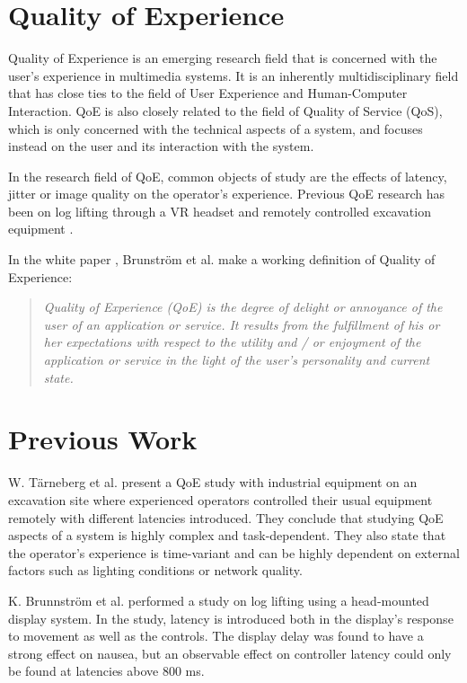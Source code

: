\documentclass[nofilelist]{cslthse-msc}
\begin{document}
\section{Quality of Experience}
Quality of Experience is an emerging research field that is concerned with the user's experience in multimedia systems. It is an inherently multidisciplinary field that has close ties to the field of User Experience and Human-Computer Interaction. QoE is also closely related to the field of Quality of Service (QoS), which is only concerned with the technical aspects of a system, and focuses instead on the user and its interaction with the system.

In the research field of QoE, common objects of study are the effects of latency, jitter or image quality on the operator's experience. Previous QoE research has been on log lifting through a VR headset \cite{industry4.0} and remotely controlled excavation equipment \cite{latency-impact}.

In the white paper \cite{qoe-definition}, Brunström et al. make a working definition of Quality of Experience: 

\begin{quote}
   \textit{Quality of Experience (QoE) is the degree of delight or annoyance of the user of an application or service. It results from the fulfillment of his or her expectations with respect to the utility and / or enjoyment of the application or service in the light of the user’s personality and current state.} 
\end{quote}

\section{Previous Work}

W. Tärneberg et al. \cite{industry4.0} present a QoE study with industrial equipment on an excavation site where experienced operators controlled their usual equipment remotely with different latencies introduced. They conclude that studying QoE aspects of a system is highly complex and task-dependent. They also state that the operator's experience is time-variant and can be highly dependent on external factors such as lighting conditions or network quality.

K. Brunnström et al. \cite{latency-impact} performed a study on log lifting using a head-mounted display system. In the study, latency is introduced both in the display's response to movement as well as the controls. The display delay was found to have a strong effect on nausea, but an observable effect on controller latency could only be found at latencies above 800 ms. 
\end{document}
